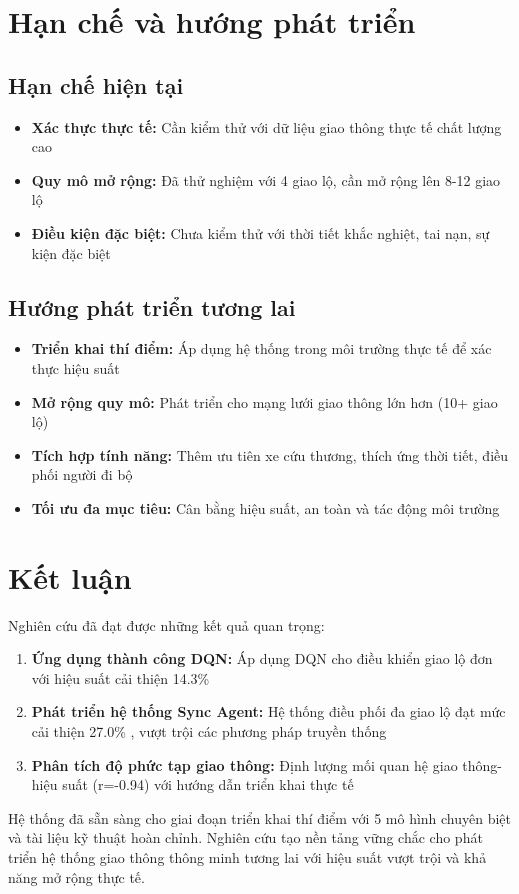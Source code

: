 \section{Hạn chế và hướng phát triển}

\subsection{Hạn chế hiện tại}
\begin{itemize}
    \item \textbf{Xác thực thực tế:} Cần kiểm thử với dữ liệu giao thông thực tế chất lượng cao
    \item \textbf{Quy mô mở rộng:} Đã thử nghiệm với 4 giao lộ, cần mở rộng lên 8-12 giao lộ
    \item \textbf{Điều kiện đặc biệt:} Chưa kiểm thử với thời tiết khắc nghiệt, tai nạn, sự kiện đặc biệt
\end{itemize}

\subsection{Hướng phát triển tương lai}
\begin{itemize}
    \item \textbf{Triển khai thí điểm:} Áp dụng hệ thống trong môi trường thực tế để xác thực hiệu suất
    \item \textbf{Mở rộng quy mô:} Phát triển cho mạng lưới giao thông lớn hơn (10+ giao lộ)
    \item \textbf{Tích hợp tính năng:} Thêm ưu tiên xe cứu thương, thích ứng thời tiết, điều phối người đi bộ
    \item \textbf{Tối ưu đa mục tiêu:} Cân bằng hiệu suất, an toàn và tác động môi trường
\end{itemize}

\section{Kết luận}

Nghiên cứu đã đạt được những kết quả quan trọng:

\begin{enumerate}
    \item \textbf{Ứng dụng thành công DQN:} Áp dụng DQN cho điều khiển giao lộ đơn với hiệu suất cải thiện 14.3\%

    \item \textbf{Phát triển hệ thống Sync Agent:} Hệ thống điều phối đa giao lộ đạt mức cải thiện 27.0\% , vượt trội các phương pháp truyền thống

    \item \textbf{Phân tích độ phức tạp giao thông:} Định lượng mối quan hệ giao thông-hiệu suất (r=-0.94) với hướng dẫn triển khai thực tế
\end{enumerate}

Hệ thống đã sẵn sàng cho giai đoạn triển khai thí điểm với 5 mô hình chuyên biệt và tài liệu kỹ thuật hoàn chỉnh. Nghiên cứu tạo nền tảng vững chắc cho phát triển hệ thống giao thông thông minh tương lai với hiệu suất vượt trội và khả năng mở rộng thực tế.